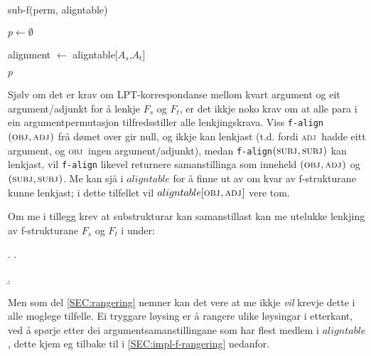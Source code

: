 \documentclass[11pt,a4paper,oneside,draft]{book}
\newcommand{\F}[2]{\textsc{#1}\ensuremath{_{#2}}}
\newcommand{\OBJ}{\F{obj}{}}
\newcommand{\OBJs}{\F{obj~}{}}
\newcommand{\ADJ}{\F{adj}{}}
\newcommand{\ADJs}{\F{adj~}{}}
\newcommand{\SUBJ}{\F{subj}{}}
\begin{document}
  \begin{algorithm}[]
    \caption{sub-f(perm, aligntable)}
    \label{algo:sub-f}
    
    $p \gets \emptyset$  \;
         {
           {
            alignment $\gets$ aligntable[$A_s$,$A_t$] \;
          }
          
        }
    \Return $p$
  \end{algorithm}    

Sjølv om det er krav om LPT-korrespondanse mellom kvart argument og
eit argument/adjunkt for å lenkje $F_s$ og $F_t$, er det ikkje noko
krav om at alle para i ein argumentpermutasjon tilfredsstiller alle
lenkjingskrava. Viss \texttt{f-align}$(\OBJ,\ADJ)$ frå dømet over gir
null, og ikkje kan lenkjast (t.d. fordi \ADJs hadde eitt argument, og
\OBJs ingen argument/adjunkt), medan \texttt{f-align}$(\SUBJ,\SUBJ)$
kan lenkjast, vil \texttt{f-align} likevel returnere samanstillinga som
inneheld $(\OBJ,\ADJ)$ og $(\SUBJ,\SUBJ)$. Me kan sjå i $aligntable$
for å finne ut av om kvar av f-strukturane kunne lenkjast; i dette
tilfellet vil $aligntable[\OBJ,\ADJ]$ vere tom.



Om me i tillegg krev at substrukturar kan samanstillast kan me
utelukke lenkjing av f-strukturane $F_s$ og $F_t$ i \Next under:

{\avmoptions{}

\ex. \a.  \begin{avm}    \end{avm}
  \b.\begin{avm}  \end{avm}

}

Men som del \ref{SEC:rangering} nemner kan det vere at me ikkje \emph{vil}
krevje dette i alle moglege tilfelle. Ei tryggare løysing er å rangere
ulike løysingar i etterkant, ved å spørje etter dei
argumentsamanstillingane som har flest medlem i $aligntable$, dette
kjem eg tilbake til i \ref{SEC:impl-f-rangering} nedanfor.
\end{document}
